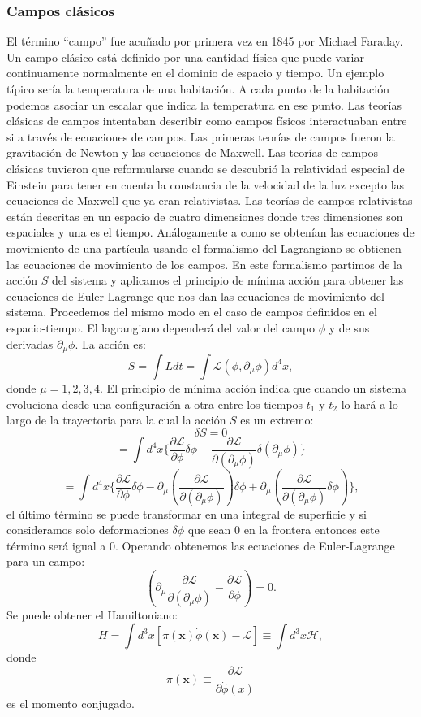 \documentclass{article}
\theoremstyle{plain}
\theoremstyle{definition}
\begin{document}
	\subsubsection{Campos clásicos}
	El término ``campo'' fue acuñado por primera vez en 1845 por Michael Faraday. Un campo clásico está definido por una cantidad física que puede variar continuamente normalmente en el dominio de espacio y tiempo. Un ejemplo típico sería la temperatura de una habitación. A cada punto de la habitación podemos asociar un escalar que indica la temperatura en ese punto. Las teorías clásicas de campos intentaban describir como campos físicos interactuaban entre si a través de ecuaciones de campos. Las primeras teorías de campos fueron la gravitación de Newton y las ecuaciones de Maxwell. Las teorías de campos clásicas  tuvieron que reformularse cuando  se descubrió la relatividad especial de Einstein para tener en cuenta la constancia de la velocidad de la luz excepto las ecuaciones de Maxwell que ya eran relativistas. Las teorías de campos relativistas están descritas en un espacio de cuatro dimensiones donde tres dimensiones son espaciales y una es el tiempo. Análogamente a como se obtenían las ecuaciones de movimiento de una partícula usando el formalismo del Lagrangiano se obtienen las ecuaciones de movimiento de los campos. En este formalismo partimos de la acción \(S\) del sistema y aplicamos el principio de mínima acción para obtener las ecuaciones de Euler-Lagrange que nos dan las ecuaciones de movimiento del sistema.  Procedemos del mismo modo en el caso de campos definidos en el espacio-tiempo. El lagrangiano dependerá del valor del campo \(\phi\) y de sus derivadas \(\partial_\mu\phi \). La acción es: \[S = \int Ldt = \int\mathcal{L}(\phi,\partial_{\mu}\phi)d^4x, \] donde \(\mu = 1,2,3,4\text{.} \)
	El principio de mínima acción indica que cuando un sistema evoluciona desde una configuración a otra entre los tiempos \(t_1\) y \(t_2\) lo hará a lo largo de la trayectoria para la cual la acción \(S\) es un extremo: \[\delta S = 0\] 
	\[= \int d^4x \Bigg\{ \frac{\partial\mathcal{L}}{\partial\phi}\delta\phi + \frac{\partial\mathcal{L}}{\partial(\partial_{\mu} \phi)}\delta(\partial_{\mu}\phi)  \Bigg\}
	\]
	\[=\int d^4x \Bigg\{\frac{\partial\mathcal{L}}{\partial\phi}\delta\phi-\partial_{\mu}\left(\frac{\partial\mathcal{L}}{\partial(\partial_{\mu} \phi)} \right)\delta\phi + \partial_{\mu}\left(\frac{\partial\mathcal{L}}{\partial(\partial_{\mu} \phi)} \delta\phi\right)  \Bigg\}, \]el último término se puede transformar en una integral de superficie y si consideramos solo deformaciones \(\delta\phi \) que sean 0 en la frontera entonces este término será igual a 0. Operando obtenemos las ecuaciones de Euler-Lagrange para un campo: \[\left(\partial_\mu\frac{\partial\mathcal{L}}{\partial(\partial_{\mu}\phi)} - \frac{\partial\mathcal{L}}{\partial\phi}\right)=0\text{.}\]
	Se puede obtener el Hamiltoniano: \[
	H=\int d^3x\left[\pi(\boldsymbol{x})\dot{\phi}(\boldsymbol{x})-\mathcal{L} \right]\equiv \int d^3x\mathcal{H},
	\]
	donde \[\pi(\boldsymbol{x})\equiv\frac{\partial\mathcal{L}}{\partial{\dot{\phi}(x)}} \] es el momento conjugado.\newline
\end{document}
